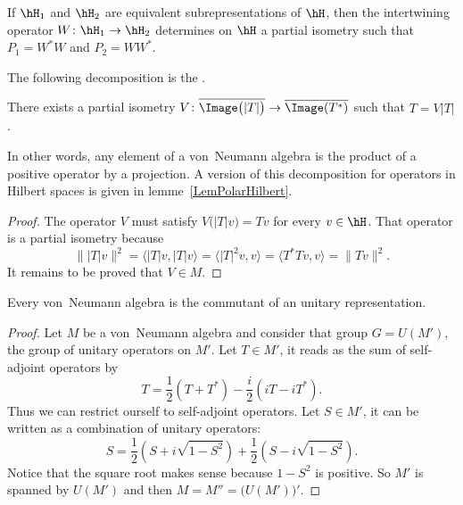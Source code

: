 \begin{proposition}
	If $\hH_1$ and $\hH_2$ are equivalent subrepresentations of $\hH$, then the intertwining operator $W\colon \hH_1\to \hH_2$ determines on $\hH$ a partial isometry such that $P_1=W^*W$ and $P_2=WW^*$.
\end{proposition}

The following decomposition is the .
\begin{proposition}		\label{PropPolarvNA}
	There exists a partial isometry $V\colon \overline{ \Image\big(| T |\big) }\to \overline{ \Image(T^*) }$ such that $T=V| T |$.
\end{proposition}

In other words, any element of a von~Neumann algebra is the product of a positive operator by a projection. A version of this decomposition for operators in Hilbert spaces is given in lemme~\ref{LemPolarHilbert}.

\begin{proof}
	The operator $V$ must satisfy $V\big( | T |v \big)=Tv$ for every $v\in\hH$. That operator is a partial isometry because
	\[
		\big\| | T |v \big\|^2=\langle | T |v, | T |v\rangle =\langle | T |^2v, v\rangle =\langle T^*Tv, v\rangle =\| Tv \|^2.
	\]
	It remains to be proved that $V\in M$.
\end{proof}



\begin{lemma}		\label{LemVNCommunit}
	Every von~Neumann algebra is the commutant of an unitary representation.
\end{lemma}

\begin{proof}
	Let $M$ be a von~Neumann algebra and consider that group $G=U(M')$, the group of unitary operators on $M'$. Let $T\in M'$, it reads as the sum of self-adjoint operators by
	\[
		T=\frac{ 1 }{2}(T+T^*)-\frac{ i }{2}(iT-iT^*).
	\]
	Thus we can restrict ourself to self-adjoint operators. Let $S\in M'$, it can be written as a combination of unitary operators:
	\[
		S=\frac{ 1 }{2}\left( S+i\sqrt{1-S^2} \right)+\frac{ 1 }{2}\left( S-i\sqrt{1-S^2} \right).
	\]
	Notice that the square root makes sense because $1-S^2$ is positive. So $M'$ is spanned by $U(M')$ and then $M=M''=\big( U(M') \big)'$.
\end{proof}

